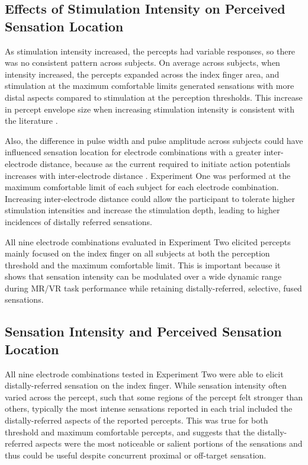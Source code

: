 \documentclass[10pt]{iopart}
\begin{document}
\subsection{Effects of Stimulation Intensity on Perceived Sensation Location}

As stimulation intensity increased, the percepts had variable responses, so there was no consistent pattern across subjects. On average across subjects, when intensity increased, the percepts expanded across the index finger area, and stimulation at the maximum comfortable limits generated sensations with more distal aspects compared to stimulation at the perception thresholds. This increase in percept envelope size when increasing stimulation intensity is consistent with the literature \cite{dalonzo_electro-cutaneous_2018, graczyk_neural_2016, slopsema_natural_2018, scarpelli_evoking_2020}.

Also, the difference in pulse width and pulse amplitude across subjects could have influenced sensation location for electrode combinations with a greater inter-electrode distance, because as  the current required to initiate action potentials increases with inter-electrode distance \cite{doheny_effect_2010}. Experiment One was performed at the maximum comfortable limit of each subject for each electrode combination. Increasing inter-electrode distance could allow the participant to tolerate higher stimulation intensities and increase the stimulation depth, leading to  higher incidences of distally referred sensations.

All nine electrode combinations evaluated in Experiment Two elicited percepts mainly focused on the index finger on all subjects at both the perception threshold and the maximum comfortable limit. This is important because it shows that sensation intensity can be modulated over a wide dynamic range during MR/VR task performance while retaining distally-referred, selective, fused sensations.

\subsection{Sensation Intensity and Perceived Sensation Location}

All nine electrode combinations tested in Experiment Two were able to elicit distally-referred sensation on the index finger. While sensation intensity often varied across the percept, such that some regions of the percept felt stronger than others, typically the most intense sensations reported in each trial included the distally-referred aspects of the reported percepts. This was true for both threshold and maximum comfortable percepts, and suggests that the distally-referred aspects were the most noticeable or salient portions of the sensations and thus could be useful despite concurrent proximal or off-target sensation. 
\end{document}
